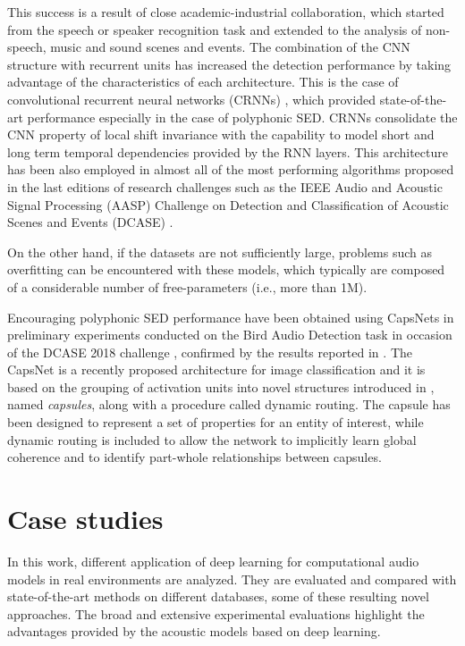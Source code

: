 This success is a result of close academic-industrial collaboration, which started from the speech or speaker recognition task and extended to the analysis of non-speech, music and sound scenes and events. The combination of the CNN structure with recurrent units has increased the detection performance by taking advantage of the characteristics of each architecture. This is the case of convolutional recurrent neural networks (CRNNs) \cite{cakir2017convolutional}, which provided state-of-the-art performance especially in the case of polyphonic SED. CRNNs consolidate the CNN property of local shift invariance with the capability to model short and long term temporal dependencies provided by the RNN layers. This architecture has been also employed in almost all of the most performing algorithms proposed in the last editions of research challenges such as the IEEE Audio and Acoustic Signal Processing (AASP) Challenge on  Detection and Classification of Acoustic Scenes and Events (DCASE) \cite{DCASE2017Workshop}. 

On the other hand, if the datasets are not sufficiently large, problems such as overfitting can be encountered with these models, which typically are composed of a considerable number of free-parameters (i.e., more than 1M). 

Encouraging polyphonic SED performance have been obtained using CapsNets in preliminary experiments conducted on the Bird Audio Detection task in occasion of the DCASE 2018 challenge \cite{vesperini2018capsule}, confirmed by the results reported in \cite{iqbal2018capsule}.
The CapsNet \cite{sabour2017dynamic} is a recently proposed architecture for image classification and it is based on the grouping of activation units into novel structures introduced in \cite{hinton2011transforming}, named \textit{capsules}, along with a procedure called dynamic routing. The capsule has been designed to represent a set of properties for an entity of interest, while dynamic routing is included to allow the network to implicitly learn global coherence and to identify part-whole relationships between capsules.





\section{Case studies}
In this work, different application of deep learning for computational audio models in real environments are analyzed. They are evaluated and compared with state-of-the-art methods on different databases, some of these resulting novel approaches. The broad and extensive experimental evaluations highlight the advantages provided by the acoustic models based on deep learning.

